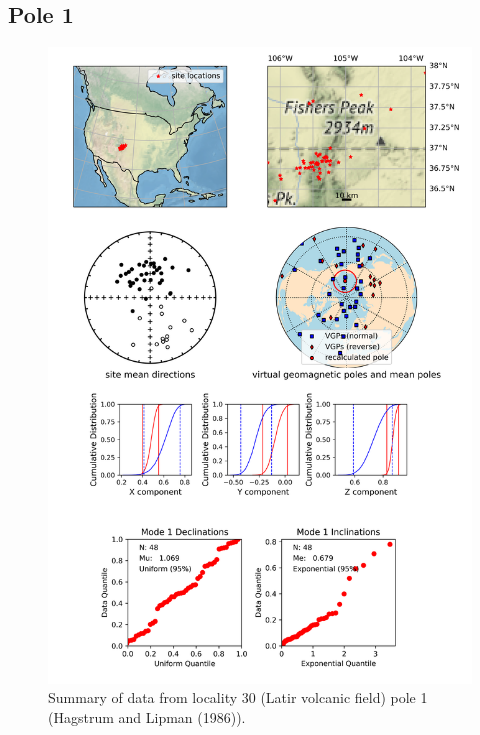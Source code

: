 \subsection{Pole 1}


\begin{figure}[H]
\centering
\includegraphics[width=5 in]{./30/1/pole_summary.png}
\caption{Summary of data from locality 30 (Latir volcanic field) pole 1 (Hagstrum and Lipman (1986)).}
\end{figure}


